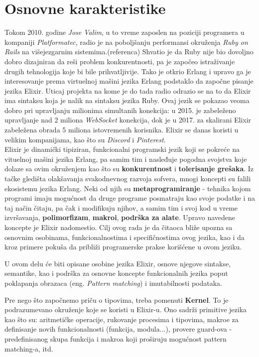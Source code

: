 \documentclass[12pt,oneside]{memoir}
\begin{document}
\newpage

\section{Osnovne karakteristike}

Tokom 2010. godine \textit{Jose Valim}, u to vreme zaposlen na poziciji programera u kompaniji \textit{Platformatec}, radio je na poboljšanju performansi okruženja
\textit{Ruby on Rails} na višejezgarnim sistemima.(referenca) Shvatio je da Ruby nije bio dovoljno dobro dizajniran da reši problem konkurentnosti, pa je započeo istraživanje drugih tehnologija koje bi bile prihvatljivije. Tako je otkrio Erlang i upravo ga je interesovanje prema virtuelnoj mašini jezika Erlang podstaklo da započne pisanje jezika Elixir. Uticaj projekta na kome je do tada radio odrazio se na to da Elixir ima sintaksu koja je nalik na sintaksu jezika Ruby. Ovaj jezik se pokazao veoma dobro pri upravljanju
milionima simultanih konekcija: u 2015. je zabeleženo upravljanje nad 2 miliona \textit{WebSocket} konekcija, dok je u 2017. za skalirani Elixir zabeležena obrada 5 miliona istovremenih korisnika. Elixir se danas koristi u velikim kompanijama, kao što su \textit{Discord}  i \textit{Pinterest}.\\

Elixir je dinamički tipiziran, funkcionalni programski jezik koji se pokreće na vituelnoj mašini jezika Erlang, pa samim tim i nasleđuje pogodna svojstva koje dolaze sa ovim okruženjem kao što su \textbf{konkurentnost} i \textbf{tolerisanje grešaka}. Iz tačke gledišta olakšavanja svakodnevnog razvoja sofvera, mnogi koncepti su falili ekosistemu jezika Erlang. Neki od njih su \textbf{metaprogramiranje} - tehnika kojom programi imaju mogućnost da druge programe posmatraju kao svoje podatke i na taj način čitaju, pa
čak i modifikuju njihov, a samim tim i svoj kod u vreme izvršavanja, \textbf{polimorfizam}, \textbf{makroi}, \textbf{podrška za alate}. Upravo navedene koncepte je  Elixir nadomestio. Cilj ovog rada je da čitaoca bliže upozna sa osnovnim osobinama, funkcionalnostima i specifičnostima ovog jezika,  kao i da kroz primere pokuša da približi programerske prakse korišćene u ovom jeziku.

U ovom delu će biti opisane osobine jezika Elixir, osnove njegove sintakse, semantike, kao i podrška za osnovne koncepte funkcionalnih jezika poput poklapanja obrazaca (eng. \textit{Pattern matching}) i imutabilnosti podataka.

Pre nego što započnemo priču o tipovima, treba pomenuti \textbf{Kernel}. To je podrazumevano okruženje koje se koristi u Elixir-u. Ono sadrži primitive jezika kao što su: aritmetičke operacije, rukovanje procesima i tipovima, makroe za definisanje novih funkcionalnosti (funkcija, modula...), provere guard-ova - predefinisanog skupa funkcija i makroa koji proširuju
mogućnost pattern matching-a, itd.
\end{document}
